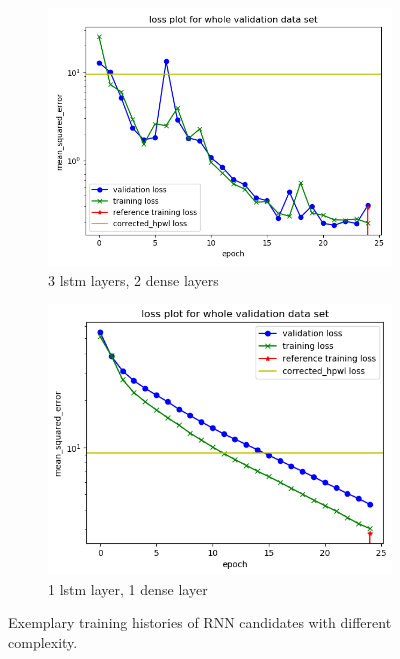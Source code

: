 \begin{figure}[H]
\centering
\begin{subfigure}[b]{0.45\linewidth}
	\includegraphics[width=\linewidth]{plots/rnn-training-history-3_lstm_layers_2_dense_layers_inflating.png}
	\caption{3 lstm layers, 2 dense layers}
	\label{fig:rnn-training-overfit}
\end{subfigure}
\begin{subfigure}[b]{0.45\linewidth}
	\includegraphics[width=\linewidth]{plots/rnn-training-history-1_lstm_layers_1_dense_layers_inflating.png}
	\caption{1 lstm layer, 1 dense layer}
	\label{fig:rnn-training-simple}
\end{subfigure}
\caption{Exemplary training histories of \gls{RNN} candidates with different complexity.}
\label{fig:rnn-training}
\end{figure}

